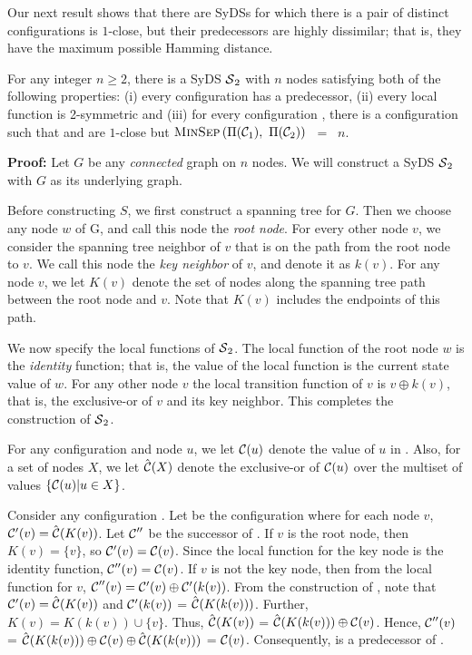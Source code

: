 Our next result shows that there are SyDSs for which 
there is a pair of distinct configurations is $1$-close, but
their predecessors are highly dissimilar; that is, they have 
the maximum possible Hamming distance.

\begin{proposition}\label{pro:close-far}
For any integer $n \geq 2$,
there is a SyDS $\mbox{$\mathcal{S}$}_2${} with $n$
nodes satisfying both of the following properties: 
(i) every configuration has a predecessor, 
(ii) every local function is 2-symmetric and
(iii) for every configuration
\calcone, there is a configuration \calctwo{} such that 
\calcone{} and \calctwo{} are $1$-close but 
$\mbox{\textsc{MinSep}}\left( \mbox{$\Pi(\mbox{$\mathcal{C}_{1}$})$},~ \mbox{$\Pi(\mbox{$\mathcal{C}_{2}$})$} \right)$ ~=~ $n$.
\end{proposition}

\noindent
\textbf{Proof:} 
Let $G$ be any \emph{connected} graph on $n$ nodes.
We will construct a SyDS $\mbox{$\mathcal{S}$}_2${} with $G$ as its  underlying graph.

Before constructing $S$, we first construct a  spanning tree for $G$.
Then we choose any node $w$ of G, and call this node the {\em root node}.
For every other node $v$,
we consider the spanning tree neighbor of $v$ 
that is on the path from the root node to $v$.
We call this node the {\em key neighbor} of $v$, 
and denote it as $k(v)$.  
For any node $v$,
we let $K(v)$ denote the set of nodes along 
the spanning tree path between the root node and $v$.
Note that $K(v)$ includes the endpoints of this path.

We now specify the local functions of $\mbox{$\mathcal{S}$}_2$.
The local function of the root node $w$ is the \emph{identity} function;
that is, the value of the local function is the current state value of $w$.
For any other node $v$ the local transition function of $v$ is $v \oplus k(v)$, that is,
the exclusive-or of $v$ and its key neighbor.
This completes the construction of $\mbox{$\mathcal{S}$}_2$.

For any configuration \calc{} and  node $u$, 
we let $\mbox{$\mathcal{C}$}(u)$ denote the value of $u$ in \calc.
Also, for a set of nodes  $X$,
we let $\hat{\mbox{$\mathcal{C}$}}(X)$ denote the exclusive-or of $\mbox{$\mathcal{C}$}(u)$ 
over the multiset of values  $\{\mbox{$\mathcal{C}$}(u) | u \in X\}$.

Consider any configuration \calc.
Let \calcp{} be the configuration where for each node $v$, 
$\mbox{$\mathcal{C'}$}(v) = \hat{\mbox{$\mathcal{C}$}}(K(v))$.
Let $\mbox{$\mathcal{C}$}''$ be the successor of \calcp.
If $v$ is the root node, then $K(v) = \{v\}$, so $\mbox{$\mathcal{C'}$}(v) = \mbox{$\mathcal{C}$}(v)$.
Since the local function for the key node is the identity function,
$\mbox{$\mathcal{C}$}''(v) = \mbox{$\mathcal{C}$}(v)$.
If $v$ is not the key node, then from the local function for $v$,
$\mbox{$\mathcal{C}$}''(v) = \mbox{$\mathcal{C'}$}(v)  \oplus \mbox{$\mathcal{C'}$}(k(v))$.
From the construction of \calcp, note that
$\mbox{$\mathcal{C'}$}(v) = \hat{\mbox{$\mathcal{C}$}}(K(v))$ and $\mbox{$\mathcal{C'}$}(k(v))$ =  
$\hat{\mbox{$\mathcal{C}$}}(K(k(v)))$.
Further, $K(v) = K(k(v)) \cup \{v\}$.
Thus, $\hat{\mbox{$\mathcal{C}$}}(K(v))$ = $\hat{\mbox{$\mathcal{C}$}}(K(k(v))) \oplus \mbox{$\mathcal{C}$}(v)$.
Hence, $\mbox{$\mathcal{C}$}''(v)$ = $\hat{\mbox{$\mathcal{C}$}}(K(k(v))) \oplus \mbox{$\mathcal{C}$}(v) \oplus  \hat{\mbox{$\mathcal{C}$}}(K(k(v)))$
= $\mbox{$\mathcal{C}$}(v)$.
Consequently, \calcp{} is a predecessor of \calc.

